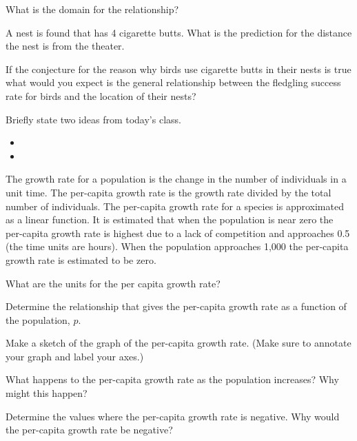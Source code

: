 \begin{problem}
\begin{subproblem}
    \vfill
    \vfill
    \vfill

  \item What is the domain for the relationship?
    \vfill
  \item A nest is found that has 4 cigarette butts. What is the
    prediction for the distance the nest is from the theater.
    \vfill
  \item If the conjecture for the reason why birds use cigarette butts
    in their nests is true what would you expect is the general
    relationship between the fledgling success rate for birds and the
    location of their nests?
  \end{subproblem}


\end{problem}

\postClass

\begin{problem}
\item Briefly state two ideas from today's class.
  \begin{itemize}
  \item
  \item
  \end{itemize}
\item The growth rate for a population is the change in the number of individuals
  in a unit time. The per-capita growth rate is the growth rate divided by
  the total number of individuals.
  The per-capita growth rate for a species is approximated as a
  linear function. It is estimated that when the population is near
  zero the per-capita growth rate is highest due to a lack of
  competition and approaches 0.5 (the time units are hours). When the
  population approaches 1,000 the per-capita growth rate is estimated
  to be zero.
  \begin{subproblem}
    \item What are the units for the per capita growth rate?
    \item Determine the relationship that gives the per-capita growth
      rate as a function of the population, $p$.
    \item Make a sketch of the graph of the per-capita growth
      rate. (Make sure to annotate your graph and label your axes.)
    \item What happens to the per-capita growth rate as the population
      increases? Why might this happen?
    \item Determine the values where the per-capita growth rate is
      negative. Why would the per-capita growth rate be negative?
  \end{subproblem}
\end{problem}


